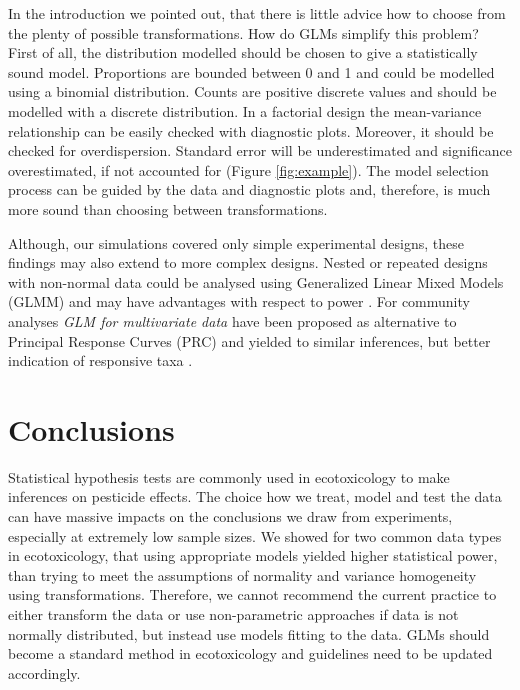 \documentclass{scrartcl}
\begin{document}
In the introduction we pointed out, that there is little advice how to choose from the plenty of possible transformations.
How do GLMs simplify this problem?
First of all, the distribution modelled should be chosen to give a statistically sound model.
Proportions are bounded between 0 and 1 and could be modelled using a binomial distribution.
Counts are positive discrete values and should be modelled with a discrete distribution.
In a factorial design the mean-variance relationship can be easily checked with diagnostic plots.
Moreover, it should be checked for overdispersion. 
Standard error will be underestimated and significance overestimated, if not accounted for (Figure \ref{fig:example}).
The model selection process can be guided by the data and diagnostic plots and, therefore, is much more sound than choosing between transformations.


Although, our simulations covered only simple experimental designs, these findings may also extend to more complex designs. 
Nested or repeated designs with non-normal data could be analysed using Generalized Linear Mixed Models (GLMM) and may have advantages with respect to power \citep{stroup_rethinking_2014}.
For community analyses \emph{GLM for multivariate data} have been proposed as alternative to Principal Response Curves (PRC) and yielded to similar inferences, but better indication of responsive taxa \citep{warton_distance-based_2012,szocs_analysing_2015}.



\newpage
\section{Conclusions}
Statistical hypothesis tests are commonly used in ecotoxicology to make inferences on pesticide effects.
The choice how we treat, model and test the data can have massive impacts on the conclusions we draw from experiments, especially at extremely low sample sizes.
We showed for two common data types in ecotoxicology, that using appropriate models yielded higher statistical power, than trying to meet the assumptions of normality and variance homogeneity using transformations. 
Therefore, we cannot recommend the current practice to either transform the data or use non-parametric approaches if data is not normally distributed, but instead use models fitting to the data. 
GLMs should become a standard method in ecotoxicology and guidelines need to be updated accordingly.



\newpage


\end{document}
